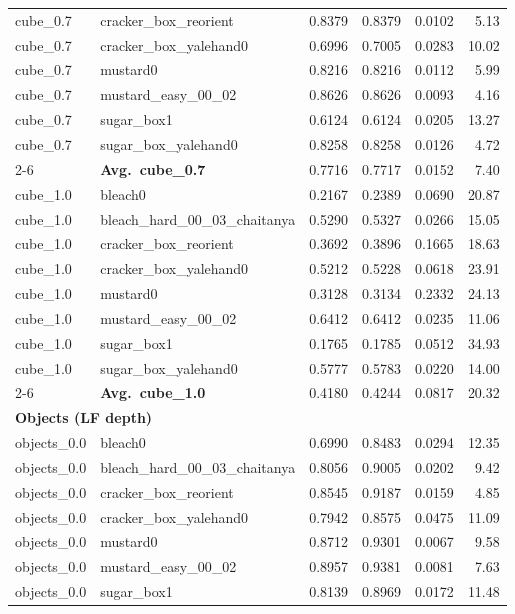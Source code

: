\begin{longtable}{llrrrr}
  cube_0.7 & cracker\_box\_reorient & 0.8379 & 0.8379 & 0.0102 & 5.13 \\
  cube_0.7 & cracker\_box\_yalehand0 & 0.6996 & 0.7005 & 0.0283 & 10.02 \\
  cube_0.7 & mustard0 & 0.8216 & 0.8216 & 0.0112 & 5.99 \\
  cube_0.7 & mustard\_easy\_00\_02 & 0.8626 & 0.8626 & 0.0093 & 4.16 \\
  cube_0.7 & sugar\_box1 & 0.6124 & 0.6124 & 0.0205 & 13.27 \\
  cube_0.7 & sugar\_box\_yalehand0 & 0.8258 & 0.8258 & 0.0126 & 4.72 \\
  \cmidrule{2-6}
  & \textbf{Avg.~cube_0.7} & 0.7716 & 0.7717 & 0.0152 & 7.40 \\
  \midrule
  cube_1.0 & bleach0 & 0.2167 & 0.2389 & 0.0690 & 20.87 \\
  cube_1.0 & bleach\_hard\_00\_03\_chaitanya & 0.5290 & 0.5327 & 0.0266 & 15.05 \\
  cube_1.0 & cracker\_box\_reorient & 0.3692 & 0.3896 & 0.1665 & 18.63 \\
  cube_1.0 & cracker\_box\_yalehand0 & 0.5212 & 0.5228 & 0.0618 & 23.91 \\
  cube_1.0 & mustard0 & 0.3128 & 0.3134 & 0.2332 & 24.13 \\
  cube_1.0 & mustard\_easy\_00\_02 & 0.6412 & 0.6412 & 0.0235 & 11.06 \\
  cube_1.0 & sugar\_box1 & 0.1765 & 0.1785 & 0.0512 & 34.93 \\
  cube_1.0 & sugar\_box\_yalehand0 & 0.5777 & 0.5783 & 0.0220 & 14.00 \\
  \cmidrule{2-6}
  & \textbf{Avg.~cube_1.0} & 0.4180 & 0.4244 & 0.0817 & 20.32 \\
  \midrule
\multicolumn{6}{l}{\textbf{Objects (LF depth)}} \\
\midrule
  objects_0.0 & bleach0 & 0.6990 & 0.8483 & 0.0294 & 12.35 \\
  objects_0.0 & bleach\_hard\_00\_03\_chaitanya & 0.8056 & 0.9005 & 0.0202 & 9.42 \\
  objects_0.0 & cracker\_box\_reorient & 0.8545 & 0.9187 & 0.0159 & 4.85 \\
  objects_0.0 & cracker\_box\_yalehand0 & 0.7942 & 0.8575 & 0.0475 & 11.09 \\
  objects_0.0 & mustard0 & 0.8712 & 0.9301 & 0.0067 & 9.58 \\
  objects_0.0 & mustard\_easy\_00\_02 & 0.8957 & 0.9381 & 0.0081 & 7.63 \\
  objects_0.0 & sugar\_box1 & 0.8139 & 0.8969 & 0.0172 & 11.48 \\

\end{longtable}
